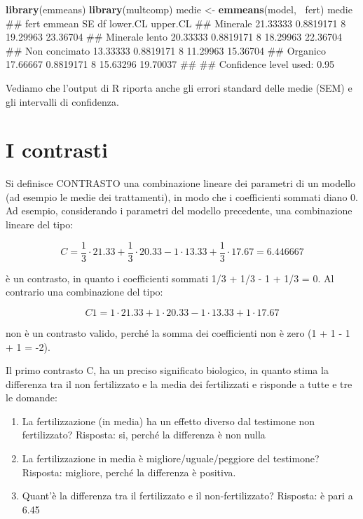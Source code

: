 \documentclass[a4paper,12pt,oneside]{book}
\providecommand{\tightlist}{%
  \setlength{\itemsep}{0pt}\setlength{\parskip}{0pt}}
\newenvironment{Shaded}{\begin{snugshade}}{\end{snugshade}}
\newcommand{\KeywordTok}[1]{\textcolor[rgb]{0.13,0.29,0.53}{\textbf{#1}}}
\newcommand{\StringTok}[1]{\textcolor[rgb]{0.31,0.60,0.02}{#1}}
\newcommand{\OperatorTok}[1]{\textcolor[rgb]{0.81,0.36,0.00}{\textbf{#1}}}
\newcommand{\NormalTok}[1]{#1}
\theoremstyle{definition}
\theoremstyle{definition}
\theoremstyle{definition}
\theoremstyle{remark}
\begin{document}
\begin{Shaded}
\begin{Highlighting}[]
\KeywordTok{library}\NormalTok{(emmeans)}
\KeywordTok{library}\NormalTok{(multcomp)}
\NormalTok{medie <-}\StringTok{ }\KeywordTok{emmeans}\NormalTok{(model, }\OperatorTok{~}\NormalTok{fert)}
\NormalTok{medie}
\NormalTok{##  fert             emmean        SE df lower.CL upper.CL}
\NormalTok{##  Minerale       21.33333 0.8819171  8 19.29963 23.36704}
\NormalTok{##  Minerale lento 20.33333 0.8819171  8 18.29963 22.36704}
\NormalTok{##  Non concimato  13.33333 0.8819171  8 11.29963 15.36704}
\NormalTok{##  Organico       17.66667 0.8819171  8 15.63296 19.70037}
\NormalTok{## }
\NormalTok{## Confidence level used: 0.95}
\end{Highlighting}
\end{Shaded}

Vediamo che l'output di R riporta anche gli errori standard delle medie
(SEM) e gli intervalli di confidenza.

\section{I contrasti}\label{i-contrasti}

Si definisce CONTRASTO una combinazione lineare dei parametri di un
modello (ad esempio le medie dei trattamenti), in modo che i
coefficienti sommati diano 0. Ad esempio, considerando i parametri del
modello precedente, una combinazione lineare del tipo:

\[ C = \frac{1}{3} \cdot 21.33 + \frac{1}{3} \cdot 20.33 - 1 \cdot 13.33 + \frac{1}{3} \cdot 17.67 = 6.446667\]

è un contrasto, in quanto i coefficienti sommati 1/3 + 1/3 - 1 + 1/3 =
0. Al contrario una combinazione del tipo:

\[C1 = 1 \cdot 21.33  + 1 \cdot 20.33 - 1 \cdot 13.33 + 1 \cdot 17.67\]

non è un contrasto valido, perché la somma dei coefficienti non è zero
(1 + 1 - 1 + 1 = -2).

Il primo contrasto C, ha un preciso significato biologico, in quanto
stima la differenza tra il non fertilizzato e la media dei fertilizzati
e risponde a tutte e tre le domande:

\begin{enumerate}
\def\labelenumi{\arabic{enumi}.}
\tightlist
\item
  La fertilizzazione (in media) ha un effetto diverso dal testimone non
  fertilizzato? Risposta: si, perché la differenza è non nulla
\item
  La fertilizzazione in media è migliore/uguale/peggiore del testimone?
  Risposta: migliore, perché la differenza è positiva.
\item
  Quant'è la differenza tra il fertilizzato e il non-fertilizzato?
  Risposta: è pari a 6.45
\end{enumerate}
\end{document}

